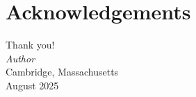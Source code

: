 %

\chapter*{Acknowledgements}


\lipsum[1]
Thank you! \\

\vspace{1em}
\mbox{} \hfill \textit{Author}\\
\mbox{} \hfill Cambridge, Massachusetts\\
\mbox{} \hfill August 2025
